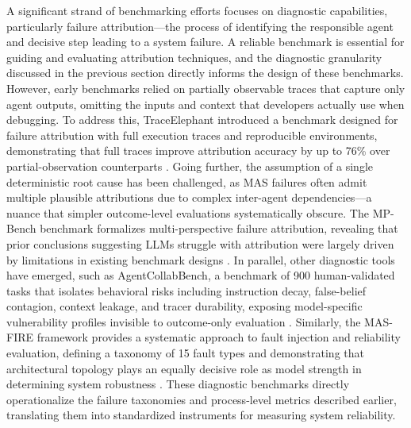 \documentclass[11pt]{article}
\begin{document}
A significant strand of benchmarking efforts focuses on diagnostic capabilities, particularly failure attribution---the process of identifying the responsible agent and decisive step leading to a system failure. A reliable benchmark is essential for guiding and evaluating attribution techniques, and the diagnostic granularity discussed in the previous section directly informs the design of these benchmarks. However, early benchmarks relied on partially observable traces that capture only agent outputs, omitting the inputs and context that developers actually use when debugging. To address this, TraceElephant introduced a benchmark designed for failure attribution with full execution traces and reproducible environments, demonstrating that full traces improve attribution accuracy by up to 76\% over partial-observation counterparts \cite{ref345}. Going further, the assumption of a single deterministic root cause has been challenged, as MAS failures often admit multiple plausible attributions due to complex inter-agent dependencies---a nuance that simpler outcome-level evaluations systematically obscure. The MP-Bench benchmark formalizes multi-perspective failure attribution, revealing that prior conclusions suggesting LLMs struggle with attribution were largely driven by limitations in existing benchmark designs \cite{ref346}. In parallel, other diagnostic tools have emerged, such as AgentCollabBench, a benchmark of 900 human-validated tasks that isolates behavioral risks including instruction decay, false-belief contagion, context leakage, and tracer durability, exposing model-specific vulnerability profiles invisible to outcome-only evaluation \cite{ref347}. Similarly, the MAS-FIRE framework provides a systematic approach to fault injection and reliability evaluation, defining a taxonomy of 15 fault types and demonstrating that architectural topology plays an equally decisive role as model strength in determining system robustness \cite{ref348}. These diagnostic benchmarks directly operationalize the failure taxonomies and process-level metrics described earlier, translating them into standardized instruments for measuring system reliability.
\end{document}
